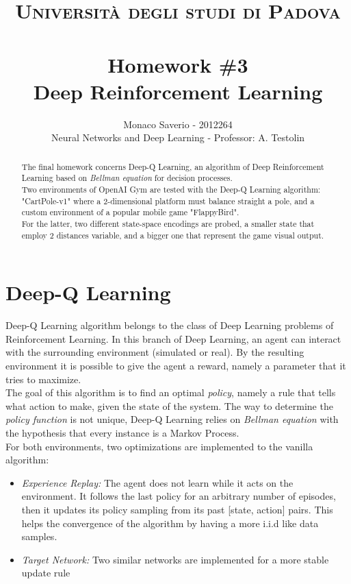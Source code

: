 \documentclass[11pt,a4paper,twocolumn]{IEEEtran}
\author{Monaco Saverio - 2012264 \sepline \\Neural Networks and Deep Learning - Professor: A. Testolin}
\title{{\normalsize\textsc{Università degli studi di Padova}}\vspace{-.5cm} \\ \sepline\\ \textbf{Homework \#3
\\ Deep Reinforcement Learning}}
\begin{document}
	\maketitle
	\begin{abstract} The final homework concerns Deep-Q Learning, an algorithm of Deep Reinforcement Learning based on \textit{Bellman equation} for decision processes.\\
	Two environments of OpenAI Gym are tested with the Deep-Q Learning algorithm: "CartPole-v1" where a 2-dimensional platform must balance straight a pole, and a custom environment of a popular mobile game "FlappyBird".\\
	For the latter, two different state-space encodings are probed, a smaller state that employ 2 distances variable, and a bigger one that represent the game visual output.
	\end{abstract}
    \section*{\textbf{Deep-Q Learning}}
    Deep-Q Learning algorithm belongs to the class of Deep Learning problems of Reinforcement Learning.
    In this branch of Deep Learning, an agent can interact with the surrounding environment (simulated or real). By the resulting environment it is possible to give the agent a reward, namely a parameter that it tries to maximize.\\
    The goal of this algorithm is to find an optimal \textit{policy}, namely a rule that tells what action to make, given the state of the system. The way to determine the \textit{policy function} is not unique, Deep-Q Learning relies on \textit{Bellman equation} with the hypothesis that every instance is a Markov Process.\medskip\\
    For both environments, two optimizations are implemented to the vanilla algorithm:
    \begin{itemize}
		\item \textit{Experience Replay:} The agent does not learn while it acts on the environment. It follows the last policy for an arbitrary number of episodes, then it updates its policy sampling from its past [state, action] pairs. This helps the convergence of the algorithm by having a more i.i.d like data samples.
		\item \textit{Target Network:} Two similar networks are implemented for a more stable update rule
	\end{itemize}
\end{document}
